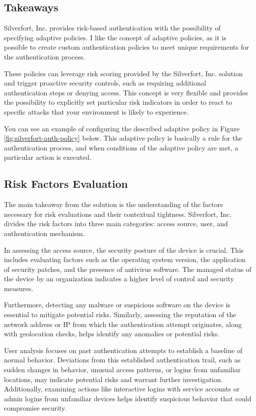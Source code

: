 \subsection*{Takeaways}

Silverfort, Inc. provides risk-based authentication with the possibility of specifying adaptive policies.
I like the concept of adaptive policies, as it is possible to create custom authentication policies to meet unique requirements for the authentication process.

These policies can leverage risk scoring provided by the Silverfort, Inc. solution and trigger proactive security controls, such as requiring additional authentication steps or denying access. 
This concept is very flexible and provides the possibility to explicitly set particular risk indicators in order to react to specific attacks that your environment is likely to experience.

You can see an example of configuring the described adaptive policy in Figure \ref{fig:silverfort-auth-policy} below.
This adaptive policy is basically a rule for the authentication process, and when conditions of the adaptive policy are met, a particular action is executed.\cite{example_silverfort}

\subsection*{Risk Factors Evaluation}

The main takeaway from the solution is the understanding of the factors necessary for risk evaluations and their contextual tightness.
Silverfort, Inc. divides the risk factors into three main categories: access source, user, and authentication mechanism.

In assessing the access source, the security posture of the device is crucial.
This includes evaluating factors such as the operating system version, the application of security patches, and the presence of antivirus software.
The managed status of the device by an organization indicates a higher level of control and security measures.

Furthermore, detecting any malware or suspicious software on the device is essential to mitigate potential risks.
Similarly, assessing the reputation of the network address or IP from which the authentication attempt originates, along with geolocation checks, helps identify any anomalies or potential risks.

User analysis focuses on past authentication attempts to establish a baseline of normal behavior.
Deviations from this established authentication trail, such as sudden changes in behavior, unusual access patterns, or logins from unfamiliar locations, may indicate potential risks and warrant further investigation.
Additionally, examining actions like interactive logins with service accounts or admin logins from unfamiliar devices helps identify suspicious behavior that could compromise security.

